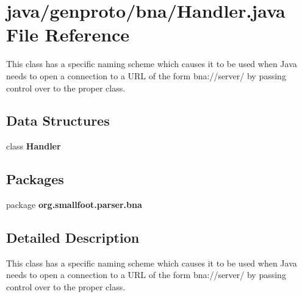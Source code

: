 \section{java/genproto/bna/\+Handler.java File Reference}
\label{bna_2Handler_8java}


This class has a specific naming scheme which causes it to be used when Java needs to open a connection to a U\+R\+L of the form bna\+://server/ by passing control over to the proper class.  


\subsection*{Data Structures}
\begin{DoxyCompactItemize}
\item 
class {\bf Handler}
\end{DoxyCompactItemize}
\subsection*{Packages}
\begin{DoxyCompactItemize}
\item 
package {\bf org.\+smallfoot.\+parser.\+bna}
\end{DoxyCompactItemize}


\subsection{Detailed Description}
This class has a specific naming scheme which causes it to be used when Java needs to open a connection to a U\+R\+L of the form bna\+://server/ by passing control over to the proper class. 

